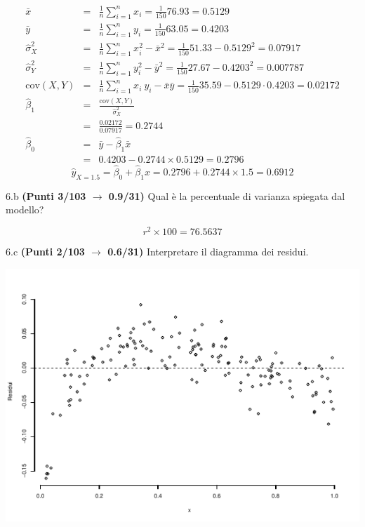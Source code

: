 \documentclass[
  11pt,
]{book}
\theoremstyle{mytheoremstyle}
\theoremstyle{mydefstyle}
\newenvironment{sol}
  {
  \begin{tcolorbox}[enhanced,breakable,arc=0.1mm,boxrule=1pt,colback=white,colframe=iblue,
  title=\bf \fontfamily{lmss}\selectfont \hspace{.5 cm} Soluzione,drop fuzzy shadow]

}{
\end{tcolorbox}
  }
\begin{document}
\begin{sol}
\begin{eqnarray*}
           \bar x &=&\frac 1 n\sum_{i=1}^n x_i = \frac {1}{ 150 }  76.93 =  0.5129 \\
           \bar y &=&\frac 1 n\sum_{i=1}^n y_i = \frac {1}{ 150 }  63.05 =  0.4203 \\
           \hat\sigma_X^2&=&\frac 1 n\sum_{i=1}^n x_i^2-\bar x^2=\frac {1}{ 150 }  51.33  - 0.5129 ^2= 0.07917 \\
           \hat\sigma_Y^2&=&\frac 1 n\sum_{i=1}^n y_i^2-\bar y^2=\frac {1}{ 150 }  27.67  - 0.4203 ^2= 0.007787 \\
           \text{cov}(X,Y)&=&\frac 1 n\sum_{i=1}^n x_i~y_i-\bar x\bar y=\frac {1}{ 150 }  35.59 - 0.5129 \cdot 0.4203 = 0.02172 \\
           \hat\beta_1 &=& \frac{\text{cov}(X,Y)}{\hat\sigma_X^2} \\
                    &=& \frac{ 0.02172 }{ 0.07917 }  =  0.2744 \\
           \hat\beta_0 &=& \bar y - \hat\beta_1 \bar x\\
                    &=&  0.4203 - 0.2744 \times  0.5129 = 0.2796 
         \end{eqnarray*}\[\hat y_{X= 1.5 }=\hat\beta_0+\hat\beta_1 x= 0.2796 + 0.2744 \times 1.5 = 0.6912 \]

\end{sol}

6.b \textbf{(Punti 3/103 \(\rightarrow\) 0.9/31)} Qual è la percentuale di varianza spiegata dal modello?

\begin{sol}
\[r^2\times 100=76.5637\]

\end{sol}

6.c \textbf{(Punti 2/103 \(\rightarrow\) 0.6/31)} Interpretare il diagramma dei residui.

\begin{center}\includegraphics{Esami_passati_con_soluzioni_files/figure-latex/2023-4,-1} \end{center}
\end{document}
